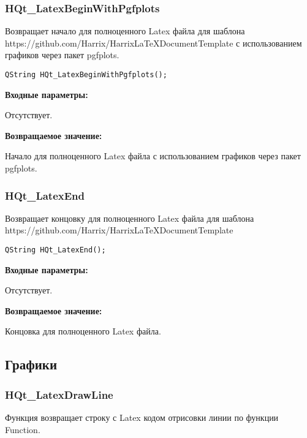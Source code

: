 \documentclass[a4paper,12pt]{article}
\begin{document}
\subsubsection{HQt\_LatexBeginWithPgfplots}\label{HQt_LatexBeginWithPgfplots}

Возвращает начало для полноценного Latex файла для шаблона https://github.com/Harrix/HarrixLaTeXDocumentTemplate с использованием графиков через пакет pgfplots.


\begin{lstlisting}[label=code_syntax_HQt_LatexBeginWithPgfplots,caption=Синтаксис]
QString HQt_LatexBeginWithPgfplots();
\end{lstlisting}

\textbf{Входные параметры:}

Отсутствует.

\textbf{Возвращаемое значение:}

Начало для полноценного Latex файла с использованием графиков через пакет pgfplots.


\subsubsection{HQt\_LatexEnd}\label{HQt_LatexEnd}

Возвращает концовку для полноценного Latex файла для шаблона https://github.com/Harrix/HarrixLaTeXDocumentTemplate


\begin{lstlisting}[label=code_syntax_HQt_LatexEnd,caption=Синтаксис]
QString HQt_LatexEnd();
\end{lstlisting}

\textbf{Входные параметры:}

Отсутствует.

\textbf{Возвращаемое значение:}

Концовка для полноценного Latex файла.


\subsection{Графики}

\subsubsection{HQt\_LatexDrawLine}\label{HQt_LatexDrawLine}

Функция возвращает строку с Latex кодом отрисовки линии по функции Function.
\end{document}
